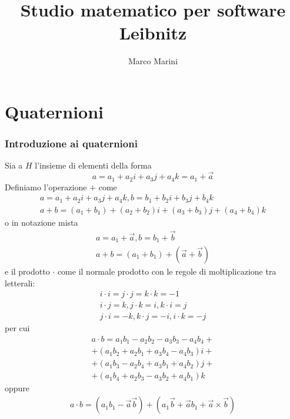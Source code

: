 \documentclass[a4paper,11pt]{article}
\title{Studio matematico per software Leibnitz}
\author{Marco Marini}
\begin{document}
\maketitle
\tableofcontents

\begin{abstract}
\end{abstract}

\part{Quaternioni}

\section{Introduzione ai quaternioni}
Sia a $H$ l'insieme di elementi della forma
\begin{equation}
	\label{eq:quatForm}
	a = a_1+a_2 i +a_3 j +a_4 k = a_1 + \vec a
\end{equation}
Definiamo l'operazione $+$ come
\begin{equation}
\begin{array}{r}
	a = a_1 + a_2 i + a_3 j + a_4 k,  b = b_1 + b_2 i + b_3 j + b_4 k
	\\
	a + b = (a_1 + b_1) + (a_2 + b_2) i + (a_3 + b_3) j + (a_4 + b_4) k
\end{array}
\end{equation}
o in notazione mista
\begin{equation}
\begin{array}{r}
	\label{eq:somma}
	a = a_1 + \vec a,  b = b_1 + \vec b
	\\
	a + b = (a_1 + b_1) + (\vec a + \vec b)
\end{array}
\end{equation}
e il prodotto $\cdot$ come il normale prodotto con le regole di moltiplicazione tra letterali:
\begin{equation}
\begin{array}{r}
	i \cdot i = j \cdot j = k \cdot k = -1
	\\
	i \cdot j = k, j \cdot k = i, 	k \cdot i = j 
	\\
	j \cdot i = -k, k \cdot j = -i, i \cdot k = -j 
\end{array}
\end{equation}
per cui
\begin{equation}
\begin{array}{r}
	a \cdot b  =a_1 b_1 - a_2 b_2 - a_3 b_3 - a_4 b_4 +
\\
	+ (a_1 b_2 + a_2 b_1 + a_3 b_4 - a_4 b_3) i +
\\
	+ (a_1 b_3 - a_2 b_4 + a_3 b_1 + a_4 b_2) j +
\\
	+ (a_1 b_4 + a_2 b_3 - a_3 b_2 + a_4 b_1) k
\end{array}
\end{equation}
oppure
\begin{equation}
\begin{array}{r}
	\label{eq:prodotto}
	a \cdot b = (a_1 b_1 - \vec a \vec b) + (a_1 \vec b + \vec a b_1 + \vec a \times \vec b)
\end{array}
\end{equation}
\end{document}
